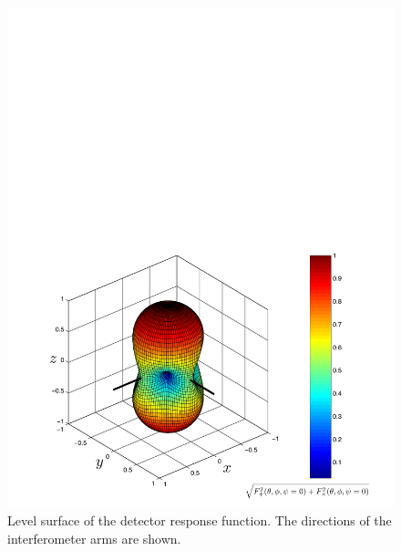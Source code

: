\begin{figure}[p]
\label{f:beampattern}
\begin{center}
\includegraphics[width=\linewidth]{figures/inspiral/beampattern}
\end{center}
\caption[Antenna Response of an Interferometer]{%
Level surface of the detector response function. The directions of the
interferometer arms are shown.
}
\end{figure}
